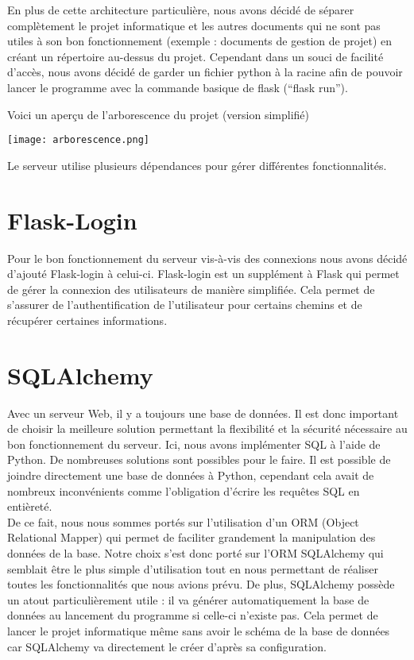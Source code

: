 \documentclass[12pt,titlepage]{report}
\begin{document}
En plus de cette architecture particulière, nous avons décidé de séparer complètement le projet informatique et les autres documents qui ne sont pas utiles à son bon fonctionnement  (exemple : documents de gestion de projet) en créant un répertoire au-dessus du projet. 
Cependant dans un souci de facilité d’accès, nous avons décidé de garder un fichier python à la racine afin de pouvoir lancer le programme avec la commande basique de flask (“flask run”).

Voici un aperçu de l'arborescence du projet (version simplifié)
\begin{center}
     \texttt{[image: arborescence.png]} 
\end{center}

Le serveur utilise plusieurs dépendances pour gérer différentes fonctionnalités.

\section{Flask-Login}

Pour le bon fonctionnement du serveur vis-à-vis des connexions nous avons décidé d'ajouté Flask-login à celui-ci. Flask-login est un supplément à Flask qui permet de gérer la connexion des utilisateurs de manière simplifiée. Cela permet de s’assurer de l’authentification de l’utilisateur pour certains chemins et de récupérer certaines informations.

\section{SQLAlchemy}

Avec un serveur Web, il y a toujours une base de données. Il est donc important de choisir la meilleure solution permettant la flexibilité et la sécurité nécessaire au bon fonctionnement du serveur. Ici, nous avons implémenter SQL à l'aide de Python. De nombreuses solutions sont possibles pour le faire. Il est possible de joindre directement une base de données à Python, cependant cela avait de nombreux inconvénients comme l’obligation d’écrire les requêtes SQL en entièreté. \\ 

De ce fait, nous nous sommes portés sur l’utilisation d’un ORM (Object Relational Mapper) qui permet de faciliter grandement la manipulation des données de la base. Notre choix s’est donc porté sur l'ORM SQLAlchemy qui semblait être le plus simple d’utilisation tout en nous permettant de réaliser toutes les fonctionnalités que nous avions prévu. De plus, SQLAlchemy possède un atout particulièrement utile : il va générer automatiquement la base de données au lancement du programme si celle-ci n’existe pas. Cela permet de lancer le projet informatique même sans avoir le schéma de la base de données car SQLAlchemy va directement le créer d’après sa configuration.
\end{document}
